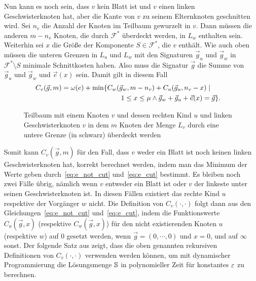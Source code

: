 Nun kann es noch sein, dass $v$ kein Blatt ist und $v$ einen linken Geschwisterknoten hat, aber die Kante von $v$ zu seinem Elternknoten geschnitten wird.
Sei $n_v$ die Anzahl der Knoten im Teilbaum gewurzelt in $v$.
Dann müssen die anderen $m - n_v$ Knoten, die durch $\mathcal{F}^*$ überdeckt werden, in $L_w$ enthalten sein.
Weiterhin sei $x$ die Größe der Komponente $S \in \mathcal{F}^*$, die $v$ enthält.
Wie auch oben müssen die unteren Grenzen in $L_u$ und $L_w$ mit den Signaturen $\vec{g}_u$ und $\vec{g}_w$ in $\mathcal{F}^* \setminus {S}$ minimale Schnittkosten haben.
Also muss die Signatur $\vec{g}$ die Summe von $\vec{g}_u$ und $\vec{g}_w$ und $\vec{e}(x)$ sein.
Damit gilt in diesem Fall
\begin{equation}\label{eq:e_cut}
    \begin{aligned}
        C_v(\vec{g}, m) = \omega(e) + \min \{ & C_w(\vec{g}_w, m - n_v) + C_u(\vec{g}_u, n_v - x) \mid \\ & \qquad 1 \leq x \leq \mu \land \vec{g}_w + \vec{g}_u + \vec{e}(x) = \vec{g} \}.
    \end{aligned}
\end{equation}

\begin{figure}
    \centering
    
    \caption{Teilbaum mit einem Knoten $v$ und dessen rechten Kind $u$ und linken Geschwisterknoten $v$ in dem $m$ Knoten der Menge $L_v$ durch eine untere Grenze (in schwarz) überdeckt werden}
\end{figure}

Somit kann $C_v(\vec{g}, m)$ für den Fall, dass $v$ weder ein Blatt ist noch keinen linken Geschwisterknoten hat, korrekt berechnet werden, indem man das Minimum der Werte geben durch~\eqref{eq:e_not_cut} und~\eqref{eq:e_cut} bestimmt.
Es bleiben noch zwei Fälle übrig, nämlich wenn $v$ entweder ein Blatt ist oder $v$ der linkeste unter seinen Geschwisterknoten ist.
In diesen Fällen existiert das rechte Kind $u$ respektive der Vorgänger $w$ nicht.
Die Definition von $C_v(\cdot, \cdot)$ folgt dann aus den Gleichungen~\eqref{eq:e_not_cut} und~\eqref{eq:e_cut}, indem die Funktionswerte $C_u(\vec{g}, x)$ (respektive $C_w(\vec{g}, x)$) für den nicht existierenden Knoten $u$ (respektive $w$) auf $0$ gesetzt werden, wenn $\vec{g} = (0, \cdots, 0)$ und $x = 0$, und auf $\infty$ sonst. 
Der folgende Satz aus \parencite{FF15} zeigt, dass die oben genannten rekursiven Definitionen von $C_v(\cdot, \cdot)$ verwenden werden können, um mit dynamischer Programmierung die Lösungsmenge $\mathbb{S}$ in polynomieller Zeit für konstantes $\varepsilon$ zu berechnen.

